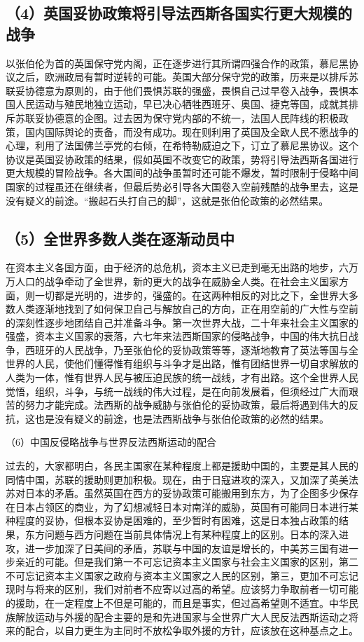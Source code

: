 \subsection{（4）英国妥协政策将引导法西斯各国实行更大规模的战争}

以张伯伦为首的英国保守党内阁，正在逐步进行其所谓四强合作的政策，慕尼黑协议之后，欧洲政局有暂时逆转的可能。英国大部分保守党的政策，历来是以排斥苏联妥协德意为原则的，由于他们畏惧苏联的强盛，畏惧自己过早卷入战争，畏惧本国人民运动与殖民地独立运动，早已决心牺牲西班牙、奥国、捷克等国，成就其排斥苏联妥协德意的企图。过去因为保守党内部的不统一，法国人民阵线的积极政策，国内国际舆论的责备，而没有成功。现在则利用了英国及全欧人民不愿战争的心理，利用了法国佛兰亭党的右倾，在希特勒威迫之下，订立了慕尼黑协议。这个协议是英国妥协政策的结果，假如英国不改变它的政策，势将引导法西斯各国进行更大规模的冒险战争。各大国间的战争虽暂时还可能不爆发，暂时限制于侵略中间国家的过程虽还在继续者，但最后势必引导各大国卷入空前残酷的战争里去，这是没有疑义的前途。“搬起石头打自己的脚”，这就是张伯伦政策的必然结果。

\subsection{（5）全世界多数人类在逐渐动员中}

在资本主义各国方面，由于经济的总危机，资本主义已走到毫无出路的地步，六万万人口的战争牵动了全世界，新的更大的战争在威胁全人类。在社会主义国家方面，则一切都是光明的，进步的，强盛的。在这两种相反的对比之下，全世界大多数人类逐渐地找到了如何保卫自己与解放自己的方向，正在用空前的广大性与空前的深刻性逐步地团结自己并准备斗争。第一次世界大战，二十年来社会主义国家的强盛，资本主义国家的衰落，六七年来法西斯国家的侵略战争，中国的伟大抗日战争，西班牙的人民战争，乃至张伯伦的妥协政策等等，逐渐地教育了英法等国与全世界的人民，使他们懂得惟有组织与斗争才是出路，惟有团结世界一切自求解放的人类为一体，惟有世界人民与被压迫民族的统一战线，才有出路。这个全世界人民觉悟，组织，斗争，与统一战线的伟大过程，是在向前发展着，但须经过广大而艰苦的努力才能完成。法西斯的战争威胁与张伯伦的妥协政策，最后将遇到伟大的反抗，这也是没有疑义的前途，也是法西斯战争与张伯伦政策的必然的结果。

（6）中国反侵略战争与世界反法西斯运动的配合

过去的，大家都明白，各民主国家在某种程度上都是援助中国的，主要是其人民的同情中国，苏联的援助则更加积极。现在，由于日寇进攻的深入，又加深了英美法苏对日本的矛盾。虽然英国在西方的妥协政策可能搬用到东方，为了企图多少保存在日本占领区的商业，为了幻想减轻日本对南洋的威胁，英国有可能同日本进行某种程度的妥协，但根本妥协是困难的，至少暂时有困难，这是日本独占政策的结果，东方问题与西方问题在当前具体情况上有某种程度上的区别。日本的深入进攻，进一步加深了日美间的矛盾，苏联与中国的友谊是增长的，中美苏三国有进一步亲近的可能。但是我们第一不可忘记资本主义国家与社会主义国家的区别，第二不可忘记资本主义国家之政府与资本主义国家之人民的区别，第三，更加不可忘记现时与将来的区别，我们对前者不应寄以过高的希望。应该努力争取前者一切可能的援助，在一定程度上不但是可能的，而且是事实，但过高希望则不适宜。中华民族解放运动与外援的配合主要的是和先进国家与全世界广大人民反法西斯运动之将来的配合，以自力更生为主同时不放松争取外援的方针，应该放在这种基点之上。

